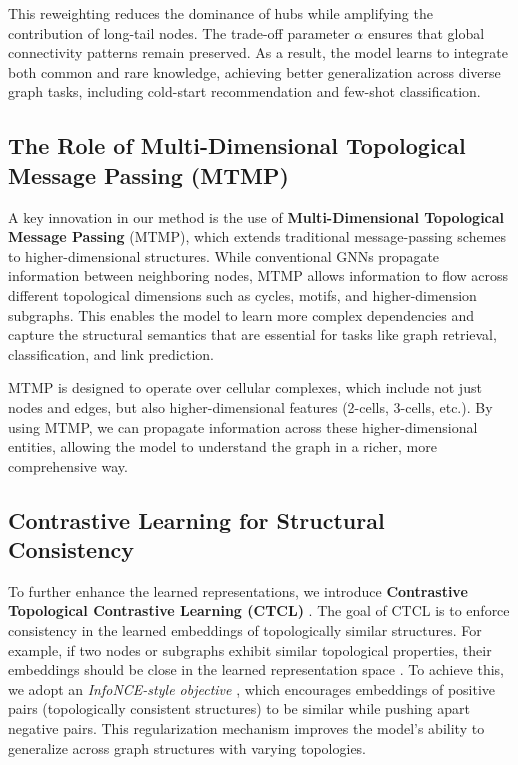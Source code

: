 This reweighting reduces the dominance of hubs while amplifying the contribution of long-tail nodes. 
The trade-off parameter $\alpha$ ensures that global connectivity patterns remain preserved. As a result, 
the model learns to integrate both common and rare knowledge, achieving better generalization across 
diverse graph tasks, including cold-start recommendation and few-shot classification.

\subsection{The Role of Multi-Dimensional Topological Message Passing (MTMP)}

A key innovation in our method is the use of \textbf{Multi-Dimensional Topological Message Passing} (MTMP), which extends traditional message-passing schemes to higher-dimensional structures. While conventional GNNs propagate information between neighboring nodes\citep{gilmer2017neural,kipf2017semi}, MTMP allows information to flow across different topological dimensions such as cycles, motifs, and higher-dimension subgraphs\citep{benson2016higher,bodnar2021topological}. This enables the model to learn more complex dependencies and capture the structural semantics that are essential for tasks like graph retrieval, classification, and link prediction.

MTMP is designed to operate over cellular complexes\citep{bodnar2021simplicial,hensel2021survey}, which include not just nodes and edges, but also higher-dimensional features (2-cells, 3-cells, etc.). By using MTMP, we can propagate information across these higher-dimensional entities, allowing the model to understand the graph in a richer, more comprehensive way.

\subsection{Contrastive Learning for Structural Consistency}

To further enhance the learned representations, we introduce \textbf{Contrastive Topological Contrastive Learning (CTCL)} \cite{you2020graphcl}. 
The goal of CTCL is to enforce consistency in the learned embeddings of topologically similar structures. 
For example, if two nodes or subgraphs exhibit similar topological properties, their embeddings should be close in the learned representation space \cite{chen2020simclr}. 
To achieve this, we adopt an \emph{InfoNCE-style objective} \cite{oord2018cpc}, which encourages embeddings of positive pairs (topologically consistent structures) to be similar while pushing apart negative pairs. 
This regularization mechanism improves the model’s ability to generalize across graph structures with varying topologies.




